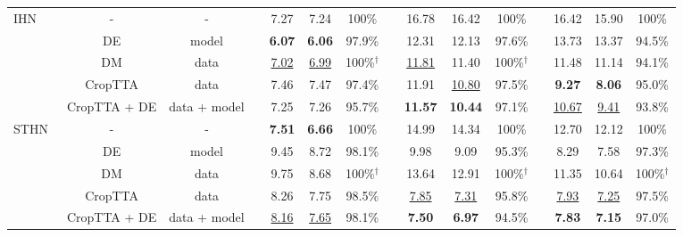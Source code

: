 \begin{table*}[]
{\begin{tabular}{lcccccccccccccc}
         \multirow{5}{3em}{IHN~\cite{cao2022iterative}} & -& -& &7.27 & 7.24& 100\% & & 16.78 & 16.42 & 100\% & & 16.42& 15.90 & 100\%\\
          & DE & model & &\textbf{6.07} &\textbf{6.06}  & 97.9\% & & 12.31 &12.13 & 97.6\% & &13.73  & 13.37 & 94.5\%\\
          & DM & data  & &\underline{7.02} &\underline{6.99} &100\%$^\dagger$ & &\underline{11.81} &11.40 & 100\%$^\dagger$ & &11.48 & 11.14& 94.1\% \\
         & CropTTA & data & &7.46 &7.47 & 97.4\% & &11.91 &\underline{10.80} & 97.5\%& &\textbf{9.27} & \textbf{8.06}& 95.0\% \\
         & CropTTA + DE & data + model & &7.25 &7.26 & 95.7\% & &\textbf{11.57} &\textbf{10.44} & 97.1\% & &\underline{10.67} & \underline{9.41} & 93.8\%\\
          \midrule
         \multirow{5}{3em}{STHN~\cite{STHN}} & -& - & &\textbf{7.51} &\textbf{6.66} & 100\% & &14.99&14.34 &100\% & &12.70& 12.12 &100\% \\
          & DE & model & &9.45 &8.72 &98.1\% & &9.98 &9.09 & 95.3\%& &8.29 &7.58  & 97.3\%\\
          & DM & data  & &9.75 &8.68 & 100\%$^\dagger$ & &13.64 & 12.91& 100\%$^\dagger$ & &11.35 &10.64  & 100\%$^\dagger$ \\
         & CropTTA & data & &8.26 &7.75 & 98.5\%& &\underline{7.85} &\underline{7.31} & 95.8\% & &\underline{7.93} &\underline{7.25} & 97.5\%\\
         & CropTTA + DE & data + model & &\underline{8.16} &\underline{7.65} &98.1\% & &\textbf{7.50} &\textbf{6.97} & 94.5\% & &\textbf{7.83} & \textbf{7.15} & 97.0\%\\

    \bottomrule
    \end{tabular}}
    \label{baseline}
    \vspace{-10pt}
\end{table*}

\begin{table}
    \centering
    \caption{Comparison of inference time (\si{ms}) for different UE methods with or without early stopping. We evaluate with 5 samples and in an NVIDIA RTX 2080Ti GPU.}
    \label{time}
    \vspace{-15pt}
\end{table}


